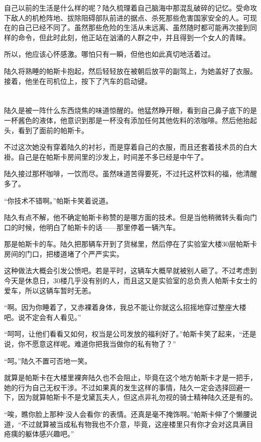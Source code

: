 自己以前的生活是什么样的呢？陆久梳理着自己脑海中那混乱破碎的记忆。受命攻下敌人的机枪阵地、拔除阻碍部队前进的据点、杀死那些危害国家安全的人。可现在的自己已经不同了。虽然那些危险的生活从未远离、虽然随时都可能再次接到同样的命令，但此时此刻，他正站在汹涌的人群之中，并且得到一个女人的青睐。

所以，他应该心怀感激。哪怕只有一瞬，但他也如此真切地活着过。

陆久将熟睡的帕斯卡抱起，然后轻轻放在被朝后放平的副驾上，为她盖好了衣服。接着，他坐在司机位上，按下了汽车的启动键。\section*{}

陆久是被一阵什么东西烧焦的味道惊醒的。他猛然睁开眼，看到自己鼻子底下的是一杯酱色的液体，他意识到那是一杯没有添加任何其他佐料的浓咖啡。然后他抬起头，看到了面前的帕斯卡。

不过这次她没有穿着陆久的衬衫，而是穿着自己的衣服，而且还套着技术员的白大褂。自己是在帕斯卡房间里的沙发上，时间差不多已经是中午了。

陆久接过那杯咖啡，一饮而尽。虽然味道苦得要死，不过托这杯饮料的福，他清醒多了。

“你技术不错啊。”帕斯卡笑着说道。

陆久有点不解，他不确定帕斯卡称赞的是哪方面的技术。但是当他稍微转头看向门口的时候，他明白了帕斯卡的话——那里停着一辆汽车。

那是帕斯卡的车。陆久把那辆车开到了货梯里，然后停在了实验室大楼30层帕斯卡房间的门口，把楼道堵了个严严实实。

这种做法大概会引发公愤吧。若是平时，这辆车大概早就被别人砸了。不过考虑到今天是休息日，30楼几乎没有别的人，而且这又是实验室的总负责人帕斯卡女士的爱车，所以这辆车暂时无恙。

“啊。因为你睡着了，又赤裸着身体，我总不能让你就这么招摇地穿过整座大楼吧。说不定会有人看见。”

“呵呵，让他们看看又如何，权当是公司发放的福利好了。”帕斯卡笑了起来，“还是说，你不愿意这样呢。难道你把我当做你的私有物了？”

“呵。”陆久不置可否地一笑。

就算是帕斯卡在大楼里裸奔陆久也不会阻止，毕竟在这个地方帕斯卡才是一把手，她的行为自己无权干涉。不过如果真的发生这样的事情，陆久一定会选择回避一下，因为就算帕斯卡不是戈黛瓦夫人，但这点非礼勿视的骑士精神陆久还是有的。

“唉，瞧你脸上那种‘没人会看你’的表情。还真是毫不掩饰啊。”帕斯卡伸了个懒腰说道，“不过就算被当成私有物我也不介意，毕竟，这座楼里只有你才会对这具满目疮痍的躯体感兴趣吧。”

